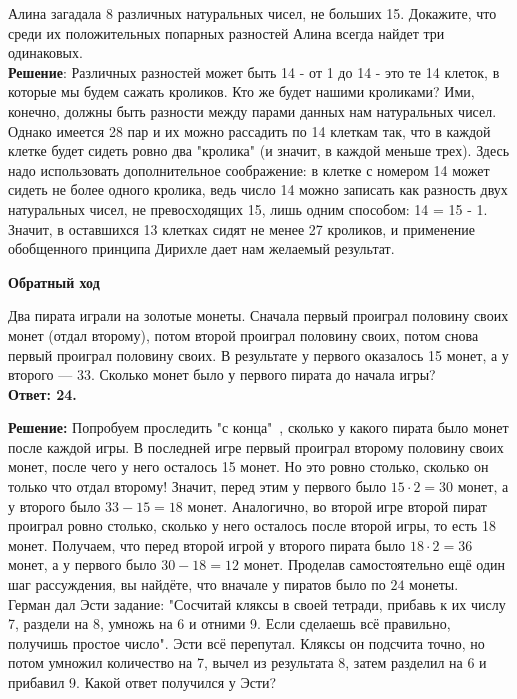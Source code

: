 Алина загадала 8 различных натуральных чисел, не больших 15. Докажите, что среди их положительных попарных разностей Алина всегда найдет три одинаковых.\\

\textbf{Решение}: Различных разностей может быть 14 - от 1 до 14 - это те 14 клеток, в которые мы будем сажать кроликов. Кто же будет нашими кроликами? Ими, конечно, должны быть разности между парами данных нам натуральных чисел. Однако имеется 28 пар и их можно рассадить по 14 клеткам так, что в каждой клетке будет сидеть ровно два "кролика" (и значит, в каждой меньше трех). Здесь надо использовать дополнительное соображение: в клетке с номером 14 может сидеть не более одного кролика, ведь число 14 можно записать как разность двух натуральных чисел, не превосходящих 15, лишь одним способом: 14 = 15 - 1. Значит, в оставшихся 13 клетках сидят не менее 27 кроликов, и применение обобщенного принципа Дирихле дает нам желаемый результат.\\

\begin{flushleft}
  \textbf{\Large Обратный ход}
\end{flushleft}

Два пирата играли на золотые монеты. Сначала первый проиграл половину своих монет (отдал второму), потом второй проиграл половину своих, потом снова первый проиграл половину своих. В результате у первого оказалось 15 монет, а у второго — 33. Сколько монет было у первого пирата до начала игры?\\ 

\textbf{Ответ: 24.}\par
\textbf{Решение:} Попробуем проследить "с конца"\ ,  сколько у какого пирата было монет после каждой игры. В последней игре первый проиграл второму половину своих монет, 
\newpage
\noindent после чего у него осталось 15 монет. Но это ровно столько, сколько он только что отдал второму! Значит, перед этим у первого было $15 \cdot 2 = 30$ монет, а у второго было $33 - 15 = 18$ монет. Аналогично, во второй игре второй пират проиграл ровно столько, сколько у него осталось после второй игры, то есть 18 монет. Получаем, что перед второй игрой у второго пирата было $18 \cdot 2 = 36$ монет, а у первого было $30 - 18 = 12$ монет. Проделав самостоятельно ещё один шаг рассуждения, вы найдёте, что вначале у пиратов было по $24$ монеты.\\

Герман дал Эсти задание: "Сосчитай кляксы в своей тетради, прибавь к их числу 7, раздели на 8, умножь на 6 и отними 9. Если сделаешь всё правильно, получишь простое число". Эсти всё перепутал. Кляксы он подсчита точно, но потом умножил количество на 7, вычел из результата 8, затем разделил на 6 и прибавил 9. Какой ответ получился у Эсти?\\

